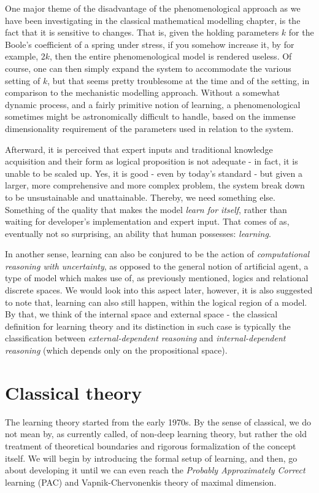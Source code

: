 One major theme of the disadvantage of the phenomenological approach as we have been investigating in the classical mathematical modelling chapter, is the fact that it is sensitive to changes. That is, given the holding parameters $k$ for the Boole's coefficient of a spring under stress, if you somehow increase it, by for example, $2k$, then the entire phenomenological model is rendered useless. Of course, one can then simply expand the system to accommodate the various setting of $k$, but that seems pretty troublesome at the time and of the setting, in comparison to the mechanistic modelling approach. Without a somewhat dynamic process, and a fairly primitive notion of learning, a phenomenological sometimes might be astronomically difficult to handle, based on the immense dimensionality requirement of the parameters used in relation to the system.

Afterward, it is perceived that expert inputs and traditional knowledge acquisition and their form as logical proposition is not adequate - in fact, it is unable to be scaled up. Yes, it is good - even by today's standard - but given a larger, more comprehensive and more complex problem, the system break down to be unsustainable and unattainable. Thereby, we need something else. Something of the quality that makes the model \textit{learn for itself}, rather than waiting for developer's implementation and expert input. That comes of as, eventually not so surprising, an ability that human possesses: \textit{learning}. 

In another sense, learning can also be conjured to be the action of \textit{computational reasoning with uncertainty}, as opposed to the general notion of artificial agent, a type of model which makes use of, as previously mentioned, logics and relational discrete spaces. We would look into this aspect later, however, it is also suggested to note that, learning can also still happen, within the logical region of a model. By that, we think of the internal space and external space - the classical definition for learning theory and its distinction in such case is typically the classification between \textit{external-dependent reasoning} and \textit{internal-dependent reasoning} (which depends only on the propositional space). 

\section{Classical theory}

The learning theory started from the early 1970s. By the sense of classical, we do not mean by, as currently called, of non-deep learning theory, but rather the old treatment of theoretical boundaries and rigorous formalization of the concept itself. We will begin by introducing the formal setup of learning, and then, go about developing it until we can even reach the \textit{Probably Approximately Correct} learning (PAC) and Vapnik-Chervonenkis theory of maximal dimension. 

